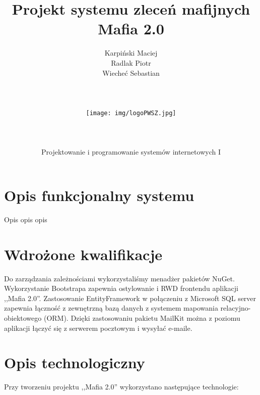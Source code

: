 \documentclass[12pt,a4paper]{article}
\author{Karpiński Maciej\\Radlak Piotr\\Wiecheć Sebastian\\\\\\\\\texttt{[image: img/logoPWSZ.jpg]}\\\\\\\\Projektowanie i programowanie systemów internetowych I}
\title{Projekt systemu zleceń mafijnych\\Mafia 2.0}
\begin{document}
	\maketitle
	\thispagestyle{empty}
	\clearpage

	\tableofcontents
	\newpage

	\section{Opis funkcjonalny systemu}
		Opis opis opis
	
	\section{Wdrożone kwalifikacje}
		
		Do zarządzania zależnościami wykorzystaliśmy menadżer pakietów NuGet.
		Wykorzystanie Bootstrapa zapewnia ostylowanie i RWD frontendu aplikacji ,,Mafia 2.0''.
		Zastosowanie EntityFramework w połączeniu z Microsoft SQL server zapewnia łączność z zewnętrzną bazą danych z systemem mapowania relacyjno-obiektowego (ORM).
		Dzięki zastosowaniu pakietu MailKit można z poziomu aplikacji łączyć się z serwerem pocztowym i wysyłać e-maile.
	
	\section{Opis technologiczny}
		Przy tworzeniu projektu ,,Mafia 2.0'' wykorzystano następujące technologie:
\end{document}
